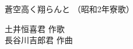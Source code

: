 \documentclass[10pt,b5j]{tarticle} %
\begin{document}
\begin{minipage}[c]{0.7\hsize} %
    \begin{center}
        {\LARGE
            蒼空高く翔らんと %
        }
        {\small 
            （昭和2年寮歌） %
        }
    \end{center}
\end{minipage}
\begin{minipage}[c]{0.3\hsize} %
    \begin{flushright} %
        土井恒喜君 作歌\\長谷川吉郎君 作曲 %
    \end{flushright}
\end{minipage}
\end{document}
